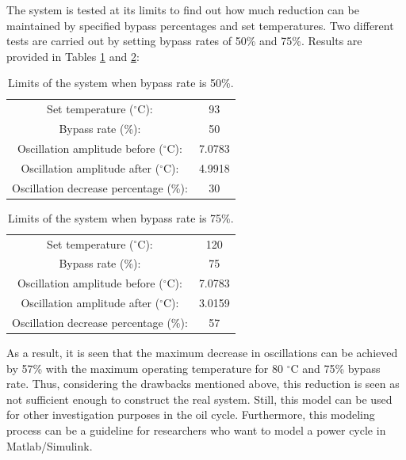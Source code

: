 \par
The system is tested at its limits to find out how much reduction can be maintained by specified bypass percentages and set temperatures. Two different tests are carried out by setting bypass rates of 50\% and 75\%. Results are provided in Tables \ref{tab:50} and \ref{tab:75}:

\begin{table}[h]
    \centering
    \begin{tabular}{|c c|}
        \hline
        Set temperature ($^\circ$C):   &  93 \\
        Bypass rate (\%):   &  50 \\
        Oscillation amplitude before ($^\circ$C):   &  7.0783 \\
        Oscillation amplitude after ($^\circ$C):   &  4.9918 \\
        Oscillation decrease percentage (\%):   &  30 \\
        \hline
    \end{tabular}
    \caption{Limits of the system when bypass rate is 50\%.}
    \label{tab:50}
\end{table}

\begin{table}[h]
    \centering
    \begin{tabular}{|c c|}
        \hline
        Set temperature ($^\circ$C):   &  120 \\
        Bypass rate (\%):   &  75 \\
        Oscillation amplitude before ($^\circ$C):   &  7.0783 \\
        Oscillation amplitude after ($^\circ$C):   &  3.0159 \\
        Oscillation decrease percentage (\%):   &  57 \\
        \hline
    \end{tabular}
    \caption{Limits of the system when bypass rate is 75\%.}
    \label{tab:75}
\end{table}

\par
As a result, it is seen that the maximum decrease in oscillations can be achieved by 57\% with the maximum operating temperature for 80 $^\circ$C and 75\% bypass rate. Thus, considering the drawbacks mentioned above, this reduction is seen as not sufficient enough to construct the real system. Still, this model can be used for other investigation purposes in the oil cycle. Furthermore, this modeling process can be a guideline for researchers who want to model a power cycle in Matlab/Simulink.   

